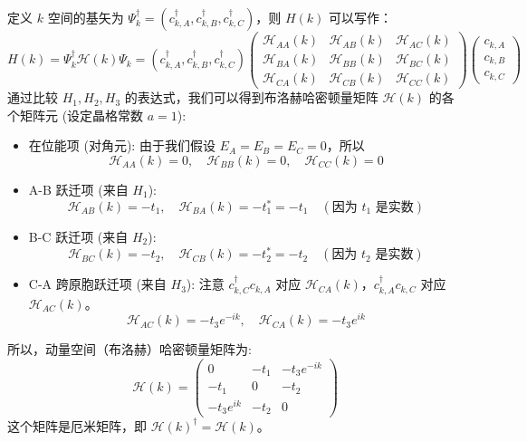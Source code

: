 \documentclass[UTF-8]{ctexart}
\begin{document}
定义 $k$ 空间的基矢为 $\Psi_k^\dagger = (c_{k,A}^\dagger, c_{k,B}^\dagger, c_{k,C}^\dagger)$，则 $H(k)$ 可以写作：
\[ H(k) = \Psi_k^\dagger \mathcal{H}(k) \Psi_k = (c_{k,A}^\dagger, c_{k,B}^\dagger, c_{k,C}^\dagger)
\begin{pmatrix}
\mathcal{H}_{AA}(k) & \mathcal{H}_{AB}(k) & \mathcal{H}_{AC}(k) \\
\mathcal{H}_{BA}(k) & \mathcal{H}_{BB}(k) & \mathcal{H}_{BC}(k) \\
\mathcal{H}_{CA}(k) & \mathcal{H}_{CB}(k) & \mathcal{H}_{CC}(k)
\end{pmatrix}
\begin{pmatrix} c_{k,A} \\ c_{k,B} \\ c_{k,C} \end{pmatrix}
\]
通过比较 $H_1, H_2, H_3$ 的表达式，我们可以得到布洛赫哈密顿量矩阵 $\mathcal{H}(k)$ 的各个矩阵元 (设定晶格常数 $a=1$):
\begin{itemize}
    \item 在位能项 (对角元): 由于我们假设 $E_A=E_B=E_C=0$，所以
    \[ \mathcal{H}_{AA}(k) = 0, \quad \mathcal{H}_{BB}(k) = 0, \quad \mathcal{H}_{CC}(k) = 0 \]
    \item A-B 跃迁项 (来自 $H_1$):
    \[ \mathcal{H}_{AB}(k) = -t_1, \quad \mathcal{H}_{BA}(k) = -t_1^* = -t_1 \quad (\text{因为 } t_1 \text{ 是实数}) \]
    \item B-C 跃迁项 (来自 $H_2$):
    \[ \mathcal{H}_{BC}(k) = -t_2, \quad \mathcal{H}_{CB}(k) = -t_2^* = -t_2 \quad (\text{因为 } t_2 \text{ 是实数}) \]
    \item C-A 跨原胞跃迁项 (来自 $H_3$):
    注意 $c_{k,C}^\dagger c_{k,A}$ 对应 $\mathcal{H}_{CA}(k)$，$c_{k,A}^\dagger c_{k,C}$ 对应 $\mathcal{H}_{AC}(k)$。
    \[ \mathcal{H}_{AC}(k) = -t_3 e^{-ik}, \quad \mathcal{H}_{CA}(k) = -t_3 e^{ik} \]
\end{itemize}
所以，动量空间（布洛赫）哈密顿量矩阵为:
\[
\mathcal{H}(k) = \begin{pmatrix}
0 & -t_1 & -t_3 e^{-ik} \\
-t_1 & 0 & -t_2 \\
-t_3 e^{ik} & -t_2 & 0
\end{pmatrix}
\]
这个矩阵是厄米矩阵，即 $\mathcal{H}(k)^\dagger = \mathcal{H}(k)$。
\end{document}
